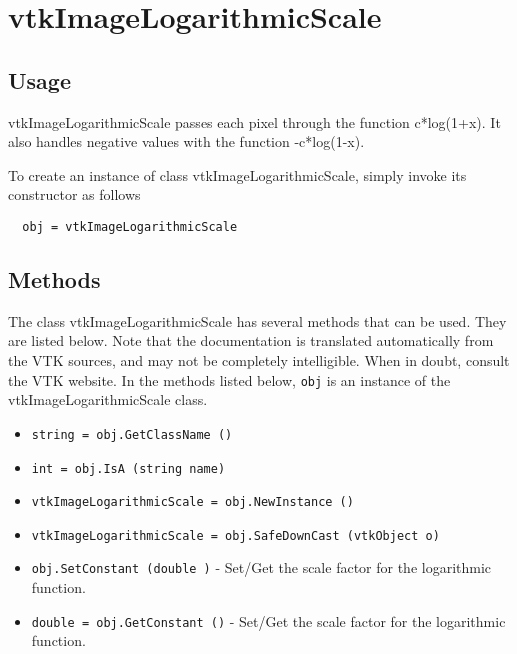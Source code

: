 \section{vtkImageLogarithmicScale}

\subsection{Usage}

 vtkImageLogarithmicScale passes each pixel through the function
 c*log(1+x).  It also handles negative values with the function
 -c*log(1-x).

To create an instance of class vtkImageLogarithmicScale, simply
invoke its constructor as follows
\begin{verbatim}
  obj = vtkImageLogarithmicScale
\end{verbatim}
\subsection{Methods}

The class vtkImageLogarithmicScale has several methods that can be used.
  They are listed below.
Note that the documentation is translated automatically from the VTK sources,
and may not be completely intelligible.  When in doubt, consult the VTK website.
In the methods listed below, \verb|obj| is an instance of the vtkImageLogarithmicScale class.
\begin{itemize}
\item  \verb|string = obj.GetClassName ()|

\item  \verb|int = obj.IsA (string name)|

\item  \verb|vtkImageLogarithmicScale = obj.NewInstance ()|

\item  \verb|vtkImageLogarithmicScale = obj.SafeDownCast (vtkObject o)|

\item  \verb|obj.SetConstant (double )| -  Set/Get the scale factor for the logarithmic function.

\item  \verb|double = obj.GetConstant ()| -  Set/Get the scale factor for the logarithmic function.

\end{itemize}

